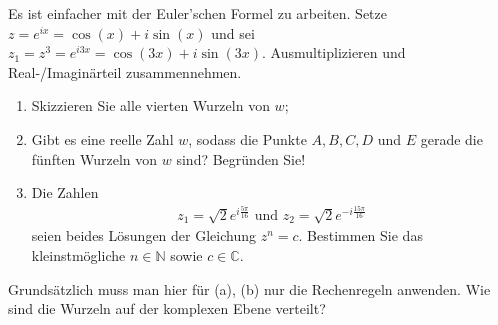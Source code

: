 \documentclass[12pt]{article}
\newcommand{\und}{\text{ und }}
\newcommand{\N}{\mathbb{N}}
\newcommand{\C}{\mathbb{C}}
\newenvironment{problem}[2][\textcolor{blue}{Tipps \& Tricks zu}]{\begin{trivlist}
        \item[\hskip \labelsep {\bfseries #1}\hskip \labelsep {\bfseries \textcolor{blue}{#2}.}]}{\end{trivlist}}
\newenvironment{question}[2][\textcolor{red}{Aufgabe}]{\begin{trivlist}
        \item[\hskip \labelsep {\bfseries \textcolor{red}{#1}}\hskip \labelsep {\bfseries \textcolor{red}{#2}.}]}{\end{trivlist}}
\begin{document}
\begin{problem}{2}
Es ist einfacher mit der Euler'schen Formel zu arbeiten. Setze $z=e^{ix}=\cos(x)+i\sin(x)$ und sei $z_1=z^3=e^{i3x}=\cos(3x)+i\sin(3x)$. Ausmultiplizieren und Real-/Imaginärteil zusammennehmen.
\end{problem}

\begin{question}{3}
        \begin{enumerate}[label=(\alph*)]
                \item Skizzieren Sie alle vierten Wurzeln von $w$;
                \item Gibt es eine reelle Zahl $w$, sodass die Punkte $A, B, C, D$ und $E$ gerade die
                      fünften Wurzeln von $w$ sind? Begründen Sie!
                \item Die Zahlen
                      \begin{align*}
                              z_1 = \sqrt{2}e^{i\frac{5\pi}{16}} \und z_2 = \sqrt{2}e^{-i\frac{15\pi}{16}}
                      \end{align*}
                      seien beides Lösungen der Gleichung $z^n = c$. Bestimmen Sie das kleinstmögliche $n \in \N$ sowie $c\in\C$.

        \end{enumerate}
\end{question}

\begin{problem}{3} Grundsätzlich muss man hier für (a), (b) nur die Rechenregeln anwenden. Wie sind die Wurzeln auf der komplexen Ebene verteilt?
\end{problem}
\end{document}
